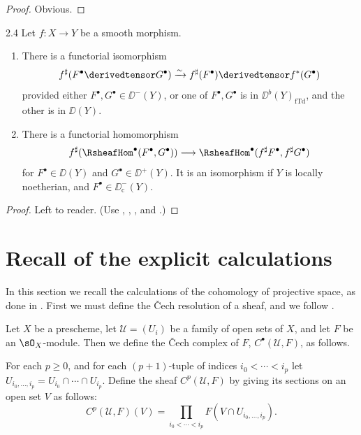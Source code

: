 \begin{proof}
Obvious.
\end{proof}

\begin{bookproposition}{2.4}\label{prop:3.2.4}
Let $f\colon X\to Y$ be a smooth morphism.
\begin{enumerate}
\item[a)] There is a functorial isomorphism
\[
f^{\sharp}(F^\bullet\derivedtensor G^\bullet) \xrightarrow{\sim} f^{\sharp}(F^\bullet)\derivedtensor  f^*(G^\bullet)
\]
provided either $F^\bullet,G^\bullet\in\DD^-(Y)$, or one of $F^\bullet,G^\bullet$ is in $\DD^b(Y)_{\mathrm{fTd}}$, and the other is in $\DD(Y)$.
\item[b)] There is a functorial homomorphism
\[
f^{\sharp}(\RsheafHom^\bullet(F^\bullet,G^\bullet)) \longrightarrow \RsheafHom^\bullet(f^{\sharp}F^\bullet, f^{\sharp}G^\bullet)
\]
for $F^\bullet\in\DD(Y)$ and $G^\bullet\in\DD^+(Y)$. It is an isomorphism if $Y$ is locally noetherian, and $F^\bullet\in\DD_{\mathrm{c}}^-(Y)$.
\end{enumerate}
\end{bookproposition}

\begin{proof}
Left to reader. (Use , , , and .)
\end{proof}

\section{Recall of the explicit calculations}\label{sec:3.3}

In this section we recall the calculations of the cohomology of projective space, as done in \cite[\nopp III,~\S1]{EGA}. First we must define the \v{C}ech resolution of a sheaf, and we follow \cite[\nopp II,~\S5]{G}.

Let $X$ be a prescheme, let $\mathcal{U}=(U_i)$ be a family of open sets of $X$, and let $F$ be an $\sO_X$-module. Then we define the \v{C}ech complex of $F$, $C^\bullet(\mathcal{U},F)$, as follows.

For each $p\ge 0$, and for each $(p+1)$-tuple of indices $i_0<\cdots<i_p$ let $U_{i_0,\dots,i_p}=U_{i_0}\cap\cdots\cap U_{i_p}$. Define the sheaf $C^p(\mathcal{U},F)$ by giving its sections on an open set $V$ as follows:
\[
C^p(\mathcal{U},F)(V) = \prod_{i_0<\cdots<i_p} F(V\cap U_{i_0,\dots,i_p}).
\]

